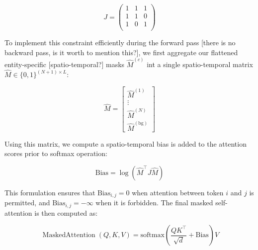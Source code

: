 \documentclass{article}
\begin{document}
\begin{equation}
    J = \begin{pmatrix}
    1 & 1 & 1 \\
    1 & 1 & 0 \\
    1 & 0 & 1 \\
\end{pmatrix}
\end{equation}

To implement this constraint efficiently during the forward pass [there is no backward pass, is it worth to mention this?], we first aggregate our flattened entity-specific [spatio-temporal?] masks $\hat{M}^{(c)}$ int a single spatio-temporal matrix $\hat{M}\in\{0,1\}^{(N+1)\times L}$:

\begin{equation}
\hat{M} = \begin{bmatrix}
\hat{M}^{(1)} \\
\vdots \\
\hat{M}^{(N)} \\
\hat{M}^{(\text{bg})}
\end{bmatrix}
\end{equation}

Using this matrix, we compute a spatio-temporal bias is added to the attention scores prior to softmax operation:


\begin{equation}
   \text{Bias} =  \log\left(\hat{M}^\top J \hat{M}\right)
\end{equation}

This formulation ensures that $\text{Bias}_{i,j} = 0$ when attention between token $i$ and $j$ is permitted, and $\text{Bias}_{i,j} = -\infty$ when it is forbidden. The final masked self-attention is then computed as:


\begin{equation}
    \operatorname{MaskedAttention}(Q, K, V) = \text{softmax}\left(\frac{Q K^\top}{\sqrt{d}} + \text{Bias}\right)V
\end{equation}


\end{document}
